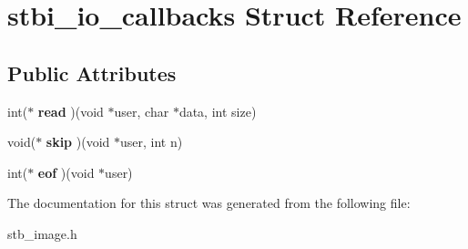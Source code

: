 \hypertarget{structstbi__io__callbacks}{}\section{stbi\+\_\+io\+\_\+callbacks Struct Reference}
\label{structstbi__io__callbacks}
\subsection*{Public Attributes}
\begin{DoxyCompactItemize}
\item 
\hypertarget{structstbi__io__callbacks_a623e46b3a2a019611601409926283a88}{}\label{structstbi__io__callbacks_a623e46b3a2a019611601409926283a88} 
int($\ast$ {\bfseries read} )(void $\ast$user, char $\ast$data, int size)
\item 
\hypertarget{structstbi__io__callbacks_a257aac5480a90a6c4b8fbe86c1b01068}{}\label{structstbi__io__callbacks_a257aac5480a90a6c4b8fbe86c1b01068} 
void($\ast$ {\bfseries skip} )(void $\ast$user, int n)
\item 
\hypertarget{structstbi__io__callbacks_a319639db2f76e715eed7a7a974136832}{}\label{structstbi__io__callbacks_a319639db2f76e715eed7a7a974136832} 
int($\ast$ {\bfseries eof} )(void $\ast$user)
\end{DoxyCompactItemize}


The documentation for this struct was generated from the following file\+:\begin{DoxyCompactItemize}
\item 
stb\+\_\+image.\+h\end{DoxyCompactItemize}
